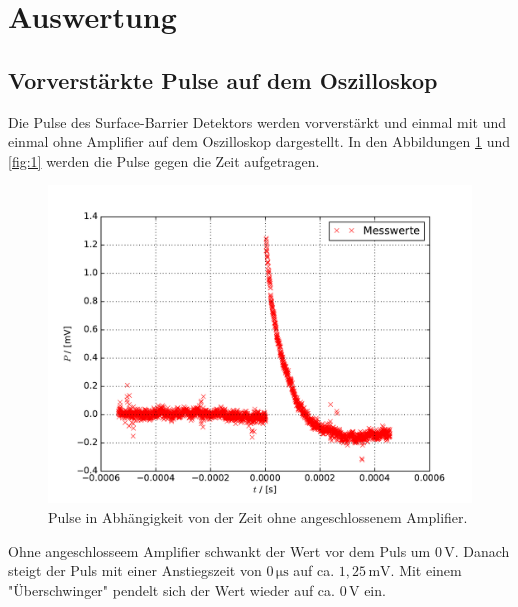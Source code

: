 \section{Auswertung}
\subsection{Vorverstärkte Pulse auf dem Oszilloskop}
\label{VPO}
Die Pulse des Surface-Barrier Detektors werden vorverstärkt und einmal mit und einmal ohne Amplifier auf dem Oszilloskop dargestellt.
In den Abbildungen \ref{fig:2} und \ref{fig:1} werden die Pulse gegen die Zeit aufgetragen.

\begin{figure}[H]
  \centering
  \includegraphics[width=\textwidth]{osz2.pdf}
  \caption{Pulse in Abhängigkeit von der Zeit ohne angeschlossenem Amplifier.}
  \label{fig:2}
\end{figure}

Ohne angeschlosseem Amplifier schwankt der Wert vor dem Puls um $0\,\text{V}$.
Danach steigt der Puls mit einer Anstiegszeit von $0\,\si{\micro\second}$ auf ca. $1,25\,\text{mV}$.
Mit einem "Überschwinger" pendelt sich der Wert wieder auf ca. $0\,\text{V}$ ein.

